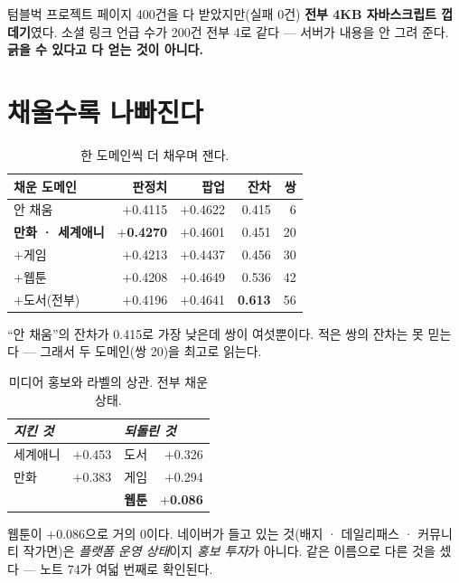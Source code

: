 \documentclass[10pt]{article}
\begin{document}
텀블벅 프로젝트 페이지 400건을 다 받았지만(실패 0건) \textbf{전부 4KB
자바스크립트 껍데기}였다. 소셜 링크 언급 수가 200건 전부 4로 같다 --- 서버가
내용을 안 그려 준다. \textbf{긁을 수 있다고 다 얻는 것이 아니다.}

\section{채울수록 나빠진다}

\begin{table}[t]
\centering\tsize
\caption{한 도메인씩 더 채우며 잰다.}
\begin{tabular}{lrrrr}
\toprule
채운 도메인 & 판정치 & 팝업 & 잔차 & 쌍 \\
\midrule
안 채움 & $+$0.4115 & $+$0.4622 & 0.415 & 6 \\
\textbf{만화 · 세계애니} & \textbf{$+$0.4270} & $+$0.4601 & 0.451 & 20 \\
$+$게임 & $+$0.4213 & $+$0.4437 & 0.456 & 30 \\
$+$웹툰 & $+$0.4208 & $+$0.4649 & 0.536 & 42 \\
$+$도서(전부) & $+$0.4196 & $+$0.4641 & \textbf{0.613} & 56 \\
\bottomrule
\end{tabular}
\end{table}

{``안 채움''의 잔차가 0.415로 가장 낮은데 쌍이 여섯뿐이다. 적은 쌍의 잔차는
못 믿는다 --- 그래서 두 도메인(쌍 20)을 최고로 읽는다.}

\begin{table}[t]
\centering\tsize
\caption{미디어 홍보와 라벨의 상관. 전부 채운 상태.}
\begin{tabular}{lrlr}
\toprule
\multicolumn{2}{l}{\emph{지킨 것}} & \multicolumn{2}{l}{\emph{되돌린 것}} \\
\midrule
세계애니 & $+$0.453 & 도서 & $+$0.326 \\
만화 & $+$0.383 & 게임 & $+$0.294 \\
& & \textbf{웹툰} & \textbf{$+$0.086} \\
\bottomrule
\end{tabular}
\end{table}

웹툰이 $+$0.086으로 거의 0이다. 네이버가 들고 있는 것(배지 · 데일리패스 ·
커뮤니티 작가면)은 \emph{플랫폼 운영 상태}이지 \emph{홍보 투자}가 아니다.
같은 이름으로 다른 것을 셌다 --- 노트 74가 여덟 번째로 확인된다.
\end{document}
